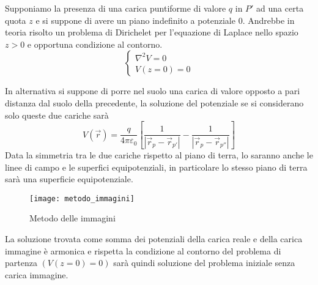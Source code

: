 Supponiamo la presenza di una carica puntiforme di valore $q$ in $P'$ ad una certa quota $z$
e si suppone di avere un piano indefinito a potenziale 0.
Andrebbe in teoria risolto un problema di Dirichelet per l'equazione di Laplace nello spazio
$z>0$ e opportuna condizione al contorno.
$$
\begin{cases}
\nabla^2 V = 0\\
V(z=0)=0
\end{cases}
$$

In alternativa si suppone di porre nel suolo una carica di valore opposto a pari distanza dal suolo
della precedente, la soluzione del potenziale se si considerano solo queste due cariche sarà
$$
V(\vec{r}) = \frac{q}{4 \pi \varepsilon_0} \left[\frac{1}{|\vec{r}_p-\vec{r}_{p'}|}-\frac{1}{|\vec{r}_p-\vec{r}_{p''}|}\right]
$$
Data la simmetria tra le due cariche rispetto al piano di
terra, lo saranno anche le linee di campo e le superfici equipotenziali, in particolare
lo stesso piano di terra sarà una superficie equipotenziale.
\begin{figure}[h!]
\centering
 \texttt{[image: metodo\_immagini]}
\caption{Metodo delle immagini}
\end{figure} 
La soluzione trovata come somma dei potenziali della carica reale e della carica immagine
è armonica e rispetta la condizione al contorno del problema di partenza $(V(z=0)=0)$ sarà
quindi soluzione del problema iniziale senza carica immagine.

